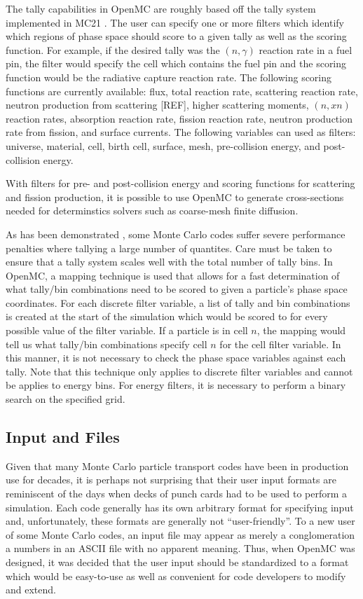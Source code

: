 \documentclass{elsarticle}
\begin{document}
The tally capabilities in OpenMC are roughly based off the tally system
implemented in MC21 \cite{MC21}. The user can specify one or more filters which
identify which regions of phase space should score to a given tally as well as
the scoring function. For example, if the desired tally was the $(n,\gamma)$
reaction rate in a fuel pin, the filter would specify the cell which contains
the fuel pin and the scoring function would be the radiative capture reaction
rate. The following scoring functions are currently available: flux, total
reaction rate, scattering reaction rate, neutron production from scattering
[REF], higher scattering moments, $(n,xn)$ reaction rates, absorption reaction
rate, fission reaction rate, neutron production rate from fission, and surface
currents. The following variables can used as filters: universe, material, cell,
birth cell, surface, mesh, pre-collision energy, and post-collision energy.

With filters for pre- and post-collision energy and scoring functions for
scattering and fission production, it is possible to use OpenMC to generate
cross-sections needed for determinstics solvers such as coarse-mesh finite
diffusion.

As has been demonstrated \cite{mcnp-efficiency}, some Monte Carlo codes suffer
severe performance penalties where tallying a large number of quantites. Care
must be taken to ensure that a tally system scales well with the total number of
tally bins. In OpenMC, a mapping technique is used that allows for a fast
determination of what tally/bin combinations need to be scored to given a
particle's phase space coordinates. For each discrete filter variable, a list of
tally and bin combinations is created at the start of the simulation which would
be scored to for every possible value of the filter variable. If a particle is
in cell $n$, the mapping would tell us what tally/bin combinations specify cell
$n$ for the cell filter variable. In this manner, it is not necessary to check
the phase space variables against each tally. Note that this technique only
applies to discrete filter variables and cannot be applies to energy bins. For
energy filters, it is necessary to perform a binary search on the specified
grid.

\subsection{Input and Files}

Given that many Monte Carlo particle transport codes have been in production use
for decades, it is perhaps not surprising that their user input formats are
reminiscent of the days when decks of punch cards had to be used to perform a
simulation. Each code generally has its own arbitrary format for specifying
input and, unfortunately, these formats are generally not ``user-friendly''. To
a new user of some Monte Carlo codes, an input file may appear as merely a
conglomeration a numbers in an ASCII file with no apparent meaning. Thus, when
OpenMC was designed, it was decided that the user input should be standardized
to a format which would be easy-to-use as well as convenient for code developers
to modify and extend.
\end{document}
